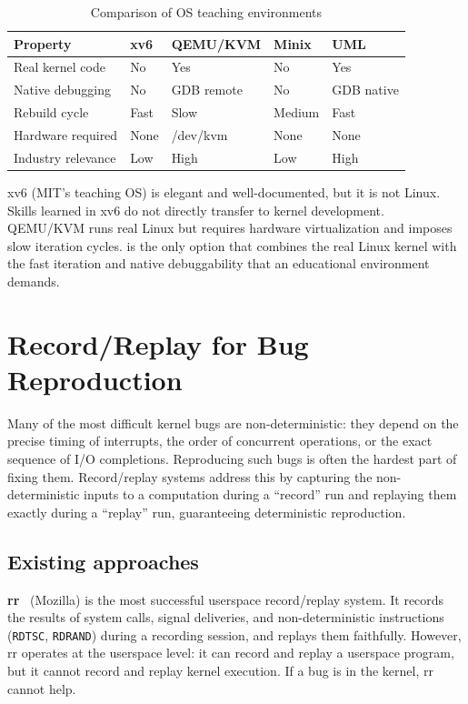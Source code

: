 \begin{table}[ht]
\centering
\caption{Comparison of OS teaching environments}
\label{tab:edu-comparison}
\begin{tabularx}{\textwidth}{l Y Y Y Y}
\toprule
\textbf{Property} & \textbf{xv6} & \textbf{QEMU/KVM} & \textbf{Minix} & \textbf{UML} \\
\midrule
Real kernel code    & No   & Yes  & No   & Yes \\
Native debugging    & No   & GDB remote & No & GDB native \\
Rebuild cycle       & Fast & Slow & Medium & Fast \\
Hardware required   & None & /dev/kvm & None & None \\
Industry relevance  & Low  & High & Low  & High \\
\bottomrule
\end{tabularx}
\end{table}

xv6 (MIT's teaching OS) is elegant and well-documented, but it is
not Linux.  Skills learned in xv6 do not directly transfer to
kernel development.  QEMU/KVM runs real Linux but requires hardware
virtualization and imposes slow iteration cycles.  \UML{} is the
only option that combines the real Linux kernel with the fast
iteration and native debuggability that an educational environment
demands.


\section{Record/Replay for Bug Reproduction}
\label{sec:app-record-replay}

Many of the most difficult kernel bugs are non-deterministic: they
depend on the precise timing of interrupts, the order of concurrent
operations, or the exact sequence of I/O completions.  Reproducing
such bugs is often the hardest part of fixing them.  Record/replay
systems address this by capturing the non-deterministic inputs to a
computation during a ``record'' run and replaying them exactly during
a ``replay'' run, guaranteeing deterministic reproduction.

\subsection{Existing approaches}

\textbf{rr}~\cite{rr-project} (Mozilla) is the most successful
userspace record/replay system.  It records the results of system
calls, signal deliveries, and non-deterministic instructions
(\texttt{RDTSC}, \texttt{RDRAND}) during a recording session, and
replays them faithfully.  However, rr operates at the userspace level:
it can record and replay a userspace program, but it cannot record and
replay kernel execution.  If a bug is in the kernel, rr cannot help.

